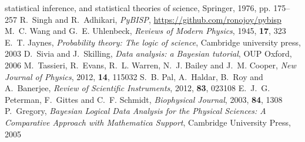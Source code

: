 \documentclass[english,aps, twocolumn, pre,superscriptaddress]{revtex4-1}
\begin{document}
\begin{mcitethebibliography}{17}
{  statistical inference, and statistical theories of science}, Springer, 1976,
  pp. 175--257\relax
\mciteBstWouldAddEndPuncttrue
\mciteSetBstMidEndSepPunct{\mcitedefaultmidpunct}
{\mcitedefaultendpunct}{\mcitedefaultseppunct}\relax
\EndOfBibitem
{}
R.~Singh and R.~Adhikari, \emph{PyBISP},
  \url{https://github.com/ronojoy/pybisp}\relax
\mciteBstWouldAddEndPuncttrue
\mciteSetBstMidEndSepPunct{\mcitedefaultmidpunct}
{\mcitedefaultendpunct}{\mcitedefaultseppunct}\relax
\EndOfBibitem
{}
M.~C. Wang and G.~E. Uhlenbeck, \emph{Reviews of Modern Physics}, 1945,
  \textbf{17}, 323\relax
\mciteBstWouldAddEndPuncttrue
\mciteSetBstMidEndSepPunct{\mcitedefaultmidpunct}
{\mcitedefaultendpunct}{\mcitedefaultseppunct}\relax
\EndOfBibitem
{}
E.~T. Jaynes, \emph{Probability theory: The logic of science}, Cambridge
  university press, 2003\relax
\mciteBstWouldAddEndPuncttrue
\mciteSetBstMidEndSepPunct{\mcitedefaultmidpunct}
{\mcitedefaultendpunct}{\mcitedefaultseppunct}\relax
\EndOfBibitem
{}
D.~Sivia and J.~Skilling, \emph{Data analysis: a Bayesian tutorial}, OUP
  Oxford, 2006\relax
\mciteBstWouldAddEndPuncttrue
\mciteSetBstMidEndSepPunct{\mcitedefaultmidpunct}
{\mcitedefaultendpunct}{\mcitedefaultseppunct}\relax
\EndOfBibitem
{}
M.~Tassieri, R.~Evans, R.~L. Warren, N.~J. Bailey and J.~M. Cooper, \emph{New
  Journal of Physics}, 2012, \textbf{14}, 115032\relax
\mciteBstWouldAddEndPuncttrue
\mciteSetBstMidEndSepPunct{\mcitedefaultmidpunct}
{\mcitedefaultendpunct}{\mcitedefaultseppunct}\relax
\EndOfBibitem
{}
S.~B. Pal, A.~Haldar, B.~Roy and A.~Banerjee, \emph{Review of Scientific
  Instruments}, 2012, \textbf{83}, 023108\relax
\mciteBstWouldAddEndPuncttrue
\mciteSetBstMidEndSepPunct{\mcitedefaultmidpunct}
{\mcitedefaultendpunct}{\mcitedefaultseppunct}\relax
\EndOfBibitem
{}
E.~J.~G. Peterman, F.~Gittes and C.~F. Schmidt, \emph{Biophysical Journal},
  2003, \textbf{84}, 1308\relax
\mciteBstWouldAddEndPuncttrue
\mciteSetBstMidEndSepPunct{\mcitedefaultmidpunct}
{\mcitedefaultendpunct}{\mcitedefaultseppunct}\relax
\EndOfBibitem
{}
P.~Gregory, \emph{Bayesian Logical Data Analysis for the Physical Sciences: A
  Comparative Approach with Mathematica{\textregistered} Support}, Cambridge
  University Press, 2005\relax
\mciteBstWouldAddEndPuncttrue
\mciteSetBstMidEndSepPunct{\mcitedefaultmidpunct}
{\mcitedefaultendpunct}{\mcitedefaultseppunct}\relax
\EndOfBibitem
\end{mcitethebibliography}
\end{document}
